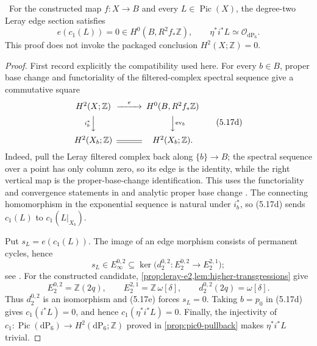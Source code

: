\begin{proposition}
\label{prop:leray-edge-restriction}
\Verified\ For the constructed map $f:X\to B$ and every
$L\in\operatorname{Pic}(X)$, the degree-two Leray edge section satisfies
\[
 e(c_1(L))=0\in H^0(B,R^2f_*\mathbb Z),
 \qquad
 \eta^*i^*L\simeq\mathcal O_{\mathrm{dP}_6}.
\tag{5.17c}
\]
This proof does not invoke the packaged conclusion
$H^2(X;\mathbb Z)=0$.
\end{proposition}

\begin{proof}
First record explicitly the compatibility used here.  For every $b\in B$,
proper base change and functoriality of the filtered-complex spectral
sequence give a commutative square
\[
\begin{CD}
 H^2(X;\mathbb Z) @>{e}>> H^0(B,R^2f_*\mathbb Z)\\
 @V{i_b^*}VV @VV{\operatorname{ev}_b}V\\
 H^2(X_b;\mathbb Z) @= H^2(X_b;\mathbb Z).
\end{CD}
\tag{5.17d}
\]
Indeed, pull the Leray filtered complex back along $\{b\}\to B$; the
spectral sequence over a point has only column zero, so its edge is the
identity, while the right vertical map is the proper-base-change
identification.  This uses the functoriality and convergence statements in
\cite[Tags~012O, 012U and~012W]{StacksProject} and analytic proper base
change \cite[Theorem~2.3.26]{Dimca2004}.  The connecting homomorphism in the
exponential sequence is natural under $i_b^*$, so (5.17d) sends
$c_1(L)$ to $c_1(L|_{X_b})$.

Put $s_L=e(c_1(L))$.  The image of an edge morphism consists of permanent
cycles, hence
\[
 s_L\in E_\infty^{0,2}\subseteq\ker
 \bigl(d_2^{0,2}:E_2^{0,2}\to E_2^{2,1}\bigr);
\tag{5.17e}
\]
see \cite[Tags~011N, 011O and~012U]{StacksProject}.  For the constructed
candidate, \cref{prop:leray-e2,lem:higher-transgressions} give
\[
 E_2^{0,2}=\mathbb Z(2q),\qquad
 E_2^{2,1}=\mathbb Z\,\omega[\delta],\qquad
 d_2^{0,2}(2q)=\omega[\delta].
\]
Thus $d_2^{0,2}$ is an isomorphism and (5.17e) forces $s_L=0$.
Taking $b=p_0$ in (5.17d) gives $c_1(i^*L)=0$, and hence
$c_1(\eta^*i^*L)=0$.  Finally, the injectivity of
$c_1:\operatorname{Pic}(\mathrm{dP}_6)\to H^2(\mathrm{dP}_6;\mathbb Z)$
proved in \cref{prop:pic0-pullback} makes $\eta^*i^*L$ trivial.
\end{proof}

